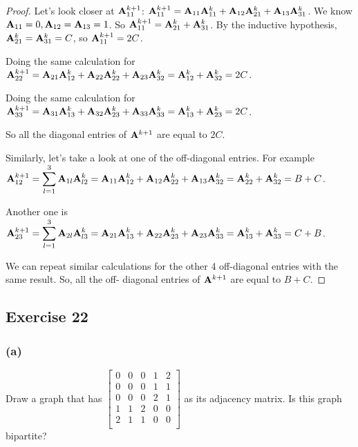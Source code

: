 \documentclass[14pt]{extarticle}
\newcommand{\dps}{\displaystyle}
\begin{document}
\begin{proof}
    Let's look closer at \({\bf A}^{k+1}_{11}\): \({\bf A}^{k+1}_{11} = {\bf A}_{11} {\bf A}^k_{11} + {\bf A}_{12} {\bf A}
    ^k_{21} + {\bf A}_{13} {\bf A}^k_{31}\). We know \({\bf A}_{11} = 0, {\bf A}_{12} = {\bf A}_{13} = 1\). So \({\bf A}
        ^{k+1}_{11} = {\bf A}^k_{21} + {\bf A}^k_{31}\). By the inductive hypothesis, \({\bf A}^k_{21} = {\bf A}^k_{31} = C\),
    so \({\bf A}^{k+1}_{11} = 2C\).

    Doing the same calculation for \({\bf A}^{k+1}_{22} = {\bf A}_{21} {\bf A}^k_{12} + {\bf A}_{22} {\bf A}^k_{22} + {\bf A}
    _{23} {\bf A}^k_{32} = {\bf A}^k_{12} + {\bf A}^k_{32} = 2C\).

    Doing the same calculation for \({\bf A}^{k+1}_{33} = {\bf A}_{31} {\bf A}^k_{13} + {\bf A}_{32} {\bf A}^k_{23} + {\bf A}
    _{33} {\bf A}^k_{33} = {\bf A}^k_{13} + {\bf A}^k_{23} = 2C\).

    So all the diagonal entries of \({\bf A}^{k+1}\) are equal to \(2C\).

    Similarly, let's take a look at one of the off-diagonal entries. For example \(\dps {\bf A}^{k+1}_{12} = \sum_{l=1}^{3} {\bf A}_{1l} {\bf A}^k_{l2} = {\bf A}_{11} {\bf A}^k_{12}
    + {\bf A}_{12} {\bf A}^k_{22} + {\bf A}_{13} {\bf A}^k_{32} =
        {\bf A}^k_{22} + {\bf A}^k_{32} = B + C\).

    Another one is \(\dps {\bf A}^{k+1}_{23} = \sum_{l=1}^{3} {\bf A}_{2l} {\bf A}^k_{l3} = {\bf A}_{21} {\bf A}^k_{13} + {\bf A}_{22} {\bf A}^k_{23} + {\bf A}_{23} {\bf A}^k_{33} = {\bf A}^k_{13} + {\bf A}^k_{33} = C + B\).

    We can repeat similar calculations for the other 4 off-diagonal entries with the same result. So, all the off-
    diagonal entries of \({\bf A}^{k+1}\) are equal to \(B+C\).
\end{proof}

\subsection{Exercise 22}
\subsubsection{(a)}
Draw a graph that has
\(
\left[
    \begin{array}{rrrrr}
        0 & 0 & 0 & 1 & 2 \\
        0 & 0 & 0 & 1 & 1 \\
        0 & 0 & 0 & 2 & 1 \\
        1 & 1 & 2 & 0 & 0 \\
        2 & 1 & 1 & 0 & 0 \\
    \end{array}
    \right]
\)
as its adjacency matrix. Is this graph bipartite?
\end{document}
